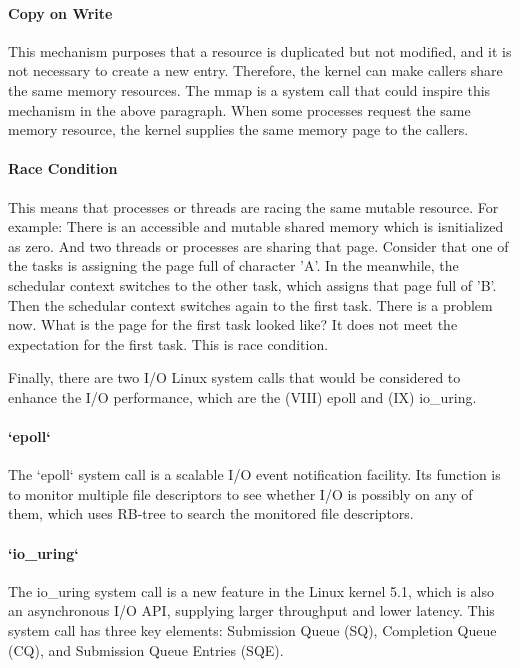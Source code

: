 \documentclass[12pt,a4paper]{article}
\begin{document}
\paragraph{Copy on Write}
This mechanism purposes that a resource is duplicated but not modified, and it is not
necessary to create a new entry. Therefore, the kernel can make callers share
the same memory resources. The mmap is a system call that could inspire this
mechanism in the above paragraph. When some processes request the same memory resource,
the kernel supplies the same memory page to the callers.

\paragraph{Race Condition}
This means that processes or threads are racing the same mutable resource. For example:
There is an accessible and mutable shared memory which is isnitialized as zero. And
two threads or processes are sharing that page. Consider that one of the tasks is assigning
the page full of character 'A'. In the meanwhile, the schedular context switches to
the other task, which assigns that page full of 'B'. Then the schedular context switches
again to the first task. There is a problem now. What is the page for the first
task looked like? It does not meet the expectation for the first task.
This is race condition.

Finally, there are two I/O Linux system calls that would be considered to enhance
the I/O performance, which are the (\RN{8}) epoll and (\RN{9}) io\_uring.

\paragraph{`epoll`}
The `epoll` system call is a scalable I/O event notification facility. Its function
is to monitor multiple file descriptors to see whether I/O is possibly on any of
them, which uses RB-tree to search the monitored file descriptors.

\paragraph{`io\_uring`}
The io\_uring system call is a new feature in the Linux kernel 5.1, which is also an
asynchronous I/O API, supplying larger throughput and lower latency. This system call
has three key elements: Submission Queue (SQ), Completion Queue (CQ), and Submission Queue
Entries (SQE).
\end{document}
